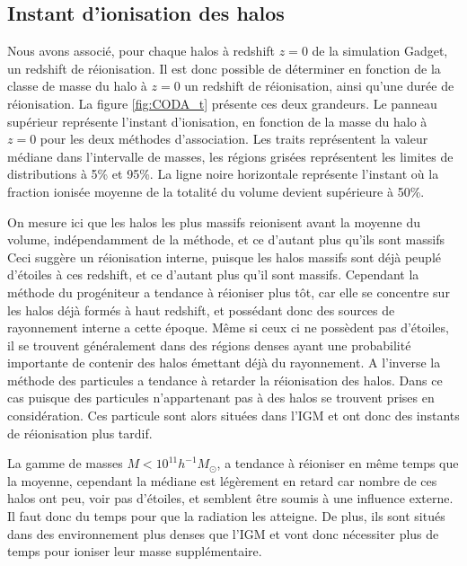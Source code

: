 \subsection{Instant d'ionisation des halos}

Nous avons associé, pour chaque halos à redshift $z=0$ de la simulation Gadget, un redshift de réionisation.
Il est donc possible de déterminer en fonction de la classe de masse du halo à $z=0$ un redshift de réionisation, ainsi qu'une durée de réionisation.
La figure \ref{fig:CODA_t} présente ces deux grandeurs.
Le panneau supérieur représente l'instant d'ionisation, en fonction de la masse du halo à $z=0$ pour les deux méthodes d'association.
Les traits représentent la valeur médiane dans l'intervalle de masses, les régions grisées représentent les limites de distributions à 5\% et 95\%.
La ligne noire horizontale représente l'instant où la fraction ionisée moyenne de la totalité du volume devient supérieure à 50\%.

On mesure ici que les halos les plus massifs reionisent avant la moyenne du volume, indépendamment de la méthode, et ce d'autant plus qu'ils sont massifs
Ceci suggère un réionisation interne, puisque les halos massifs sont déjà peuplé d'étoiles à ces redshift, et ce d'autant plus qu'il sont massifs.
Cependant la méthode du progéniteur a tendance à réioniser plus tôt, car elle se concentre sur les halos déjà formés à haut redshift, et possédant donc des sources de rayonnement interne a cette époque.
Même si ceux ci ne possèdent pas d'étoiles, il se trouvent généralement dans des régions denses ayant une probabilité importante de contenir des halos émettant déjà du rayonnement.
A l'inverse la méthode des particules a tendance à retarder la réionisation des halos. 
Dans ce cas puisque des particules n'appartenant pas à des halos se trouvent prises en considération.
Ces particule sont alors situées dans l'\ac{IGM} et ont donc des instants de réionisation plus tardif.

La gamme de masses $M <10^{11} h^{-1}M_\odot$, a tendance à réioniser en même temps que la moyenne, cependant la médiane est légèrement en retard car nombre de ces halos ont peu, voir pas d'étoiles, et semblent être soumis à une influence externe.
Il faut donc du temps pour que la radiation les atteigne.
De plus, ils sont situés dans des environnement plus denses que l'\ac{IGM} et vont donc nécessiter plus de temps pour ioniser leur masse supplémentaire.




